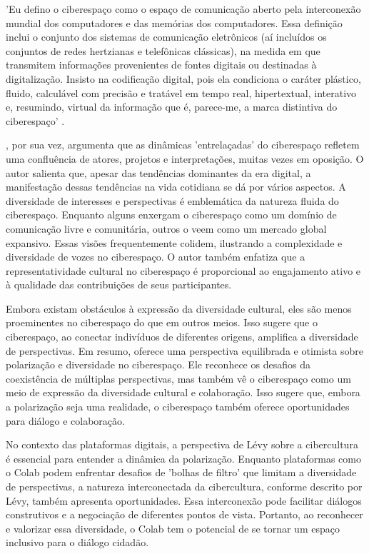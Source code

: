 \begin{citacao}
	'Eu defino o ciberespaço como o espaço de comunicação aberto pela interconexão mundial dos computadores e das memórias dos computadores. Essa definição inclui o conjunto dos sistemas de comunicação eletrônicos (aí incluídos os conjuntos de redes hertzianas e telefônicas clássicas), na medida em que transmitem informações provenientes de fontes digitais ou destinadas à digitalização. Insisto na codificação digital, pois ela condiciona o caráter plástico, fluido, calculável com precisão e tratável em tempo real, hipertextual, interativo e, resumindo, virtual da informação que é, parece-me, a marca distintiva do ciberespaço' \cite[p. 102]{2010_Levy_BOOK}.
\end{citacao}

, por sua vez, argumenta que as dinâmicas 'entrelaçadas' do ciberespaço refletem uma confluência de atores, projetos e interpretações, muitas vezes em oposição. O autor salienta que, apesar das tendências dominantes da era digital, a manifestação dessas tendências na vida cotidiana se dá por vários aspectos. A diversidade de interesses e perspectivas é emblemática da natureza fluida do ciberespaço. Enquanto alguns enxergam o ciberespaço como um domínio de comunicação livre e comunitária, outros o veem como um mercado global expansivo. Essas visões frequentemente colidem, ilustrando a complexidade e diversidade de vozes no ciberespaço. O autor também enfatiza que a representatividade cultural no ciberespaço é proporcional ao engajamento ativo e à qualidade das contribuições de seus participantes. 

Embora existam obstáculos à expressão da diversidade cultural, eles são menos proeminentes no ciberespaço do que em outros meios. Isso sugere que o ciberespaço, ao conectar indivíduos de diferentes origens, amplifica a diversidade de perspectivas. Em resumo,  oferece uma perspectiva equilibrada e otimista sobre polarização e diversidade no ciberespaço. Ele reconhece os desafios da coexistência de múltiplas perspectivas, mas também vê o ciberespaço como um meio de expressão da diversidade cultural e colaboração. Isso sugere que, embora a polarização seja uma realidade, o ciberespaço também oferece oportunidades para diálogo e colaboração.

No contexto das plataformas digitais, a perspectiva de Lévy sobre a cibercultura é essencial para entender a dinâmica da polarização. Enquanto plataformas como o Colab podem enfrentar desafios de 'bolhas de filtro' que limitam a diversidade de perspectivas, a natureza interconectada da cibercultura, conforme descrito por Lévy, também apresenta oportunidades. Essa interconexão pode facilitar diálogos construtivos e a negociação de diferentes pontos de vista. Portanto, ao reconhecer e valorizar essa diversidade, o Colab tem o potencial de se tornar um espaço inclusivo para o diálogo cidadão.


